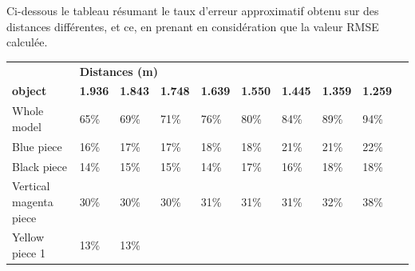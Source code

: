 \documentclass[a4paper, 12pt]{book}
\begin{document}
\vspace{2cm}

Ci-dessous le tableau résumant le taux d'erreur approximatif obtenu sur des distances différentes, et ce, en  prenant en considération que la valeur RMSE  calculée. \\



\begin{table}[H]
\centering
\setlength\tabcolsep{2pt}
\begin{tabular}{c|lllllllll}
\cline{1-9}
\multicolumn{1}{|l|}{}   & 
\multicolumn{8}{l|}{\textbf{\hspace{4.5cm} Distances (m)}}    \\
\cline{1-9}
\multicolumn{1}{|l|}{\textbf{object}}   & 
\multicolumn{1}{l|}{\textbf{1.936 }} & 
\multicolumn{1}{l|}{\textbf{1.843}} & 
\multicolumn{1}{l|}{\textbf{1.748}} &  
\multicolumn{1}{l|}{\textbf{1.639 }} & 
\multicolumn{1}{l|}{\textbf{1.550}} & 
\multicolumn{1}{l|}{\textbf{1.445}} & 
\multicolumn{1}{l|}{\textbf{1.359}} & 
\multicolumn{1}{l|}{\textbf{1.259}} & \\
\cline{1-9}
\multicolumn{1}{|l|}{Whole model}  & 
\multicolumn{1}{l|}{65\%}  &  
\multicolumn{1}{l|}{69\%}  & 
\multicolumn{1}{l|}{71\%}  & 
\multicolumn{1}{l|}{76\%}  & 
\multicolumn{1}{l|}{80\%}  & 
\multicolumn{1}{l|}{84\%}  & 
\multicolumn{1}{l|}{89\%}  & 
\multicolumn{1}{l|}{94\%}  &  \\ 
\cline{1-9}
\multicolumn{1}{|l|}{Blue piece}  &
\multicolumn{1}{l|}{16\%}  &
\multicolumn{1}{l|}{17\%}  & 
\multicolumn{1}{l|}{17\%} & 
\multicolumn{1}{l|}{18\%}  & 
\multicolumn{1}{l|}{18\%}  &  
\multicolumn{1}{l|}{21\%}  & 
\multicolumn{1}{l|}{21\%}  &
\multicolumn{1}{l|}{22\%}   &  \\ 
\cline{1-9}
\multicolumn{1}{|l|}{Black piece}  & 
\multicolumn{1}{l|}{14\%}  & 
\multicolumn{1}{l|}{15\%}  & 
\multicolumn{1}{l|}{15\%} & 
\multicolumn{1}{l|}{14\%}  & 
\multicolumn{1}{l|}{17\%}  &
\multicolumn{1}{l|}{16\%}  & 
\multicolumn{1}{l|}{18\%}  & 
\multicolumn{1}{l|}{18\%}  &  \\ 
\cline{1-9}
\multicolumn{1}{|l|}{Vertical magenta piece}  & 
\multicolumn{1}{l|}{30\%}  & 
\multicolumn{1}{l|}{30\%}  & 
\multicolumn{1}{l|}{30\%} & 
\multicolumn{1}{l|}{31\%}  & 
\multicolumn{1}{l|}{31\%}  & 
\multicolumn{1}{l|}{31\%}  & 
\multicolumn{1}{l|}{32\%}  &  
\multicolumn{1}{l|}{38\%}  & \\ 
\cline{1-9}
\multicolumn{1}{|l|}{Yellow piece 1}  & 
\multicolumn{1}{l|}{13\%}  & 
\multicolumn{1}{l|}{13\%}  & 

\end{tabular}
\end{table}
\end{document}
